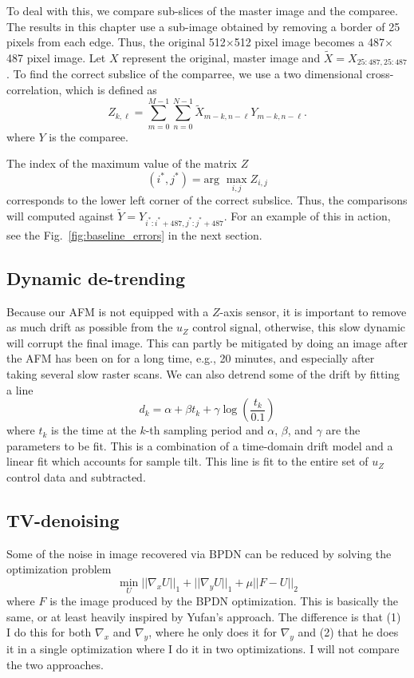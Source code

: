 \documentclass[11pt]{article}
\begin{document}
To deal with this, we compare sub-slices of the master image and the comparee. The results in this chapter use a sub-image obtained by removing a border of 25 pixels from each edge. Thus, the original 512$\times$512 pixel image becomes a 487$\times$487 pixel image. Let $X$ represent the original, master image and
${\tilde X=X_{25:487, 25:487}}$. To find the correct subslice of the comparree, we use a two dimensional cross-correlation, which is defined as
\begin{equation}
  Z_{k,\ell} = \sum_{m=0}^{M-1}\sum_{n=0}^{N-1} \tilde{X}_{m-k, n-\ell}Y_{m-k, n-\ell}.
\end{equation}
where $Y$ is the comparee.

The index of the maximum value of the matrix $Z$
\begin{equation}
(i^*,j^*) = \textrm{arg~} \max_{i,j}Z_{i,j}
\end{equation}
corresponds to the lower left corner of the correct subslice. Thus, the comparisons will computed against
$\tilde{Y} = Y_{i^*:i^*+487, j^*:j^*+487}$. For an example of this in action, see the Fig.~\ref{fig:baseline_errors} in the next section.


\subsection{Dynamic de-trending}
Because our AFM is not equipped with a $Z$-axis sensor, it is important to remove as much drift as possible from the $u_Z$ control signal, otherwise, this slow dynamic will corrupt the final image. This can partly be mitigated by doing an image after the AFM has been on for a long time, e.g., 20 minutes, and especially after taking several slow raster scans. We can also detrend some of the drift by fitting a line
\begin{equation}
  d_k = \alpha + \beta t_k + \gamma \log\left(\frac{t_k}{0.1}\right)
\end{equation}
where $t_k$ is the time at the $k$-th sampling period and $\alpha$, $\beta$, and $\gamma$ are the parameters to be fit. This is a combination of a time-domain drift model \cite{Jung_open_loop_2000} and a linear fit which accounts for sample tilt. This line is fit to the entire set of $u_Z$ control data and subtracted.


\subsection{ TV-denoising}
Some of the noise in image recovered via BPDN can be reduced by solving the optimization problem
\begin{equation}
  \min_{U} ||\nabla_xU||_1 + ||\nabla_yU||_1 + \mu||F - U||_2 \label{eqn:breg1}
\end{equation}
where $F$ is the image produced by the BPDN optimization. 
This is basically the same, or at least heavily inspired by Yufan's approach. The difference is that (1) I do this for both $\nabla_x$ and $\nabla_y$, where he only does it for $\nabla_y$ and (2) that he does it in a single optimization where I do it in two optimizations. I will not compare the two approaches.
\end{document}
